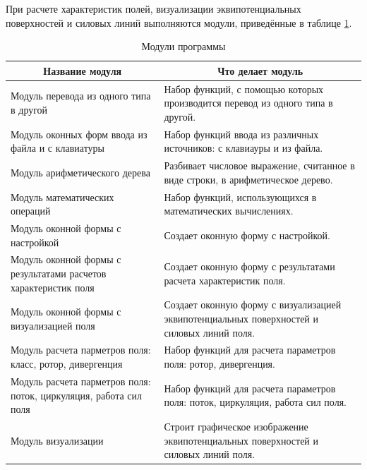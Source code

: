 \documentclass[14pt,a4paper,final]{extreport}
\begin{document}
При расчете характеристик полей, визуализации эквипотенциальных поверхностей и силовых линий выполняются модули, 
приведённые в таблице \ref{table:modules}.

\fancyhead[C]{\bfseries\thepage\\\docstamp}  %




\begin{table}[h!]
	\centering
	\begin{tabular}{|p{5cm} | p{9cm} |} 
		\hline
		\multicolumn{1}{|c|}{Название модуля} & \multicolumn{1}{c|}{Что делает модуль} \\ [0.5ex]

		\hline
		Модуль перевода из одного типа в другой &
		Набор функций, с помощью которых производится перевод из одного типа в другой.

		\\ \hline
		Модуль оконных форм ввода из файла и с клавиатуры &
		Набор функций ввода из различных источников: с клавиауры и из файла.

		\\ \hline
		Модуль арифметического дерева &
		Разбивает числовое выражение, считанное в виде строки, в арифметическое дерево.

		\\ \hline
		Модуль математических операций &
		Набор функций, использующихся в математических вычислениях.
		
		\\ \hline
		Модуль оконной формы с настройкой &
		Создает оконную форму с настройкой. 

		\\ \hline
		Модуль оконной формы с результатами расчетов характеристик поля &
		Создает оконную форму с результатами расчета характеристик поля.

		\\ \hline
		Модуль оконной формы с визуализацией поля&
		Создает оконную форму с визуализацией эквипотенциальных поверхностей и силовых линий поля.

		\\ \hline
		Модуль расчета парметров поля: класс,  ротор, дивергенция&
		Набор функций для расчета параметров поля: ротор, дивергенция.

		\\ \hline
		Модуль расчета парметров поля: поток, циркуляция, работа сил поля&
		Набор функций для расчета параметров поля: поток, циркуляция, работа сил поля.

		\\ \hline
		Модуль визуализации&
		Строит графическое изображение эквипотенциальных поверхностей и силовых линий поля.
		
		\\ [1ex] 
		\hline
	\end{tabular}
	\caption{Модули программы}
	\label{table:modules}
\end{table}
\end{document}
